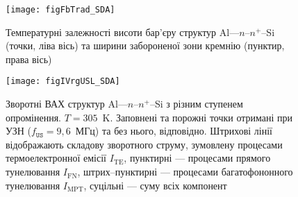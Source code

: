 \begin{figure}[b]
\center
\texttt{[image: figFbTrad\_SDA]}
\caption{\label{figFbTrad_SDA}
Температурні залежності висоти бар'єру структур Al---$n$--$n^+$--Si (точки, ліва вісь) та
ширини забороненої зони кремнію (пунктир, права вісь)
}%
\end{figure}




%


\begin{SCfigure}
\texttt{[image: figIVrgUSL\_SDA]}
\caption{\label{figIVrg0USL_SDA}
Зворотні  ВАХ  структур Al---$n$--$n^+$--Si з різним ступенем опромінення.
$T=305$~K.
Заповнені та порожні точки отримані при УЗН ($f_\mathtt{US}=9,6$~МГц) та без нього, відповідно.
Штрихові лінії відображають складову зворотного струму, зумовлену процесами термоелектронної емісії $I_\mathrm{TE}$,
пунктирні --- процесами прямого тунелювання $I_\mathrm{FN}$,
штрих--пунктирні --- процесами багатофононного тунелювання $I_\mathrm{MPT}$,
суцільні ---  суму всіх компонент
}
\end{SCfigure}

